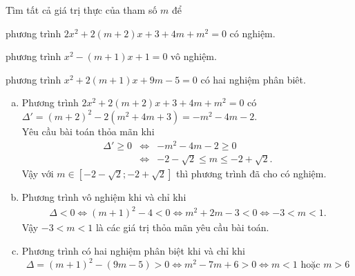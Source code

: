 \begin{bt}%
	Tìm tất cả giá trị thực của tham số $m$ để
	\begin{enumEX}[a)]{1}
		\item phương trình $2x^2+2\left( m+2 \right)x+3+4m+{m^2}=0$ có nghiệm.
		\item phương trình $x^2-(m+1)x+1=0$ vô nghiệm.
		\item phương trình $x^2+2(m+1)x+9m-5=0$ có hai nghiệm phân biêt.
	\end{enumEX}
	\loigiai
	{
		\begin{enumerate}[a)]
			\item Phương trình $2x^2+2(m+2)x+3+4m+m^2=0$ có $\Delta'=(m+2)^2-2(m^2+4m+3) = -m^2-4m-2$.\\
			Yêu cầu bài toán thỏa mãn khi
			\allowdisplaybreaks
			\begin{eqnarray*}
				\Delta' \geq 0 &\Leftrightarrow & -m^2-4m-2 \geq 0\\
				&\Leftrightarrow & -2-\sqrt{2} \leq m \leq -2+\sqrt{2}.
			\end{eqnarray*}
			Vậy với $m \in \left[-2-\sqrt{2};-2+\sqrt{2}\right]$ thì phương trình đã cho có nghiệm.
			\item Phương trình vô nghiệm khi và chỉ khi
			\begin{eqnarray*}
				\Delta <0 \Leftrightarrow (m+1)^2-4<0 \Leftrightarrow m^2+2m-3<0 \Leftrightarrow -3<m<1.
			\end{eqnarray*}
			Vậy $-3<m<1$ là các giá trị thỏa mãn yêu cầu bài toán.
			\item Phương trình có hai nghiệm phân biệt khi và chỉ khi
			$$\Delta=(m+1)^2-(9m-5)>0 \Leftrightarrow m^2-7m+6>0 \Leftrightarrow m<1 \text{ hoặc } m>6$$
			\end{enumerate}
		}
\end{bt}


